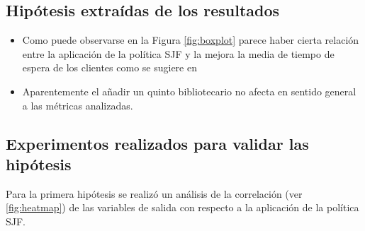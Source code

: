 \documentclass[10pt,twocolumn]{article}
\begin{document}
\subsection{Hipótesis extraídas de los resultados}
\begin{itemize}
	\item Como puede observarse en la Figura \ref{fig:boxplot} parece haber cierta relación entre la aplicación de la política SJF y la mejora la media de tiempo de espera de los clientes como se sugiere en \cite{modern_operating_systems}
	\item Aparentemente el añadir un quinto bibliotecario no afecta en sentido general a las métricas analizadas.
\end{itemize}

\subsection{Experimentos realizados para validar las hipótesis}
Para la primera hipótesis se realizó un análisis de la correlación (ver \ref{fig:heatmap}) de las variables de salida con respecto a la aplicación de la política SJF.
\end{document}
